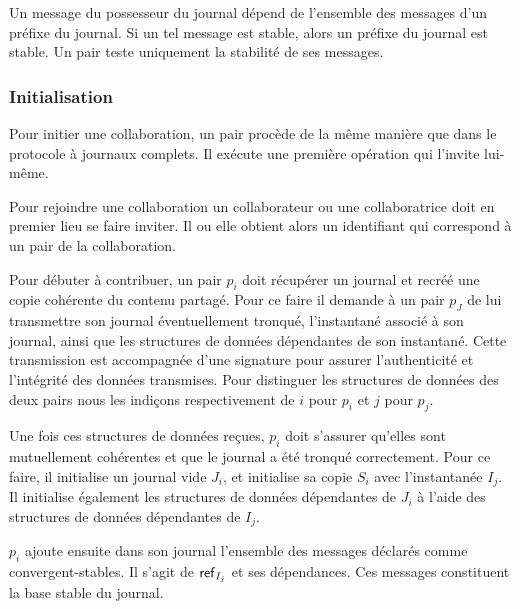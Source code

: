Un message du possesseur du journal dépend de l'ensemble des messages d'un préfixe du journal.
Si un tel message est stable, alors un préfixe du journal est stable.
Un pair teste uniquement la stabilité de ses messages.


\subsubsection{Initialisation}

Pour initier une collaboration, un pair procède de la même manière que dans le protocole à journaux complets.
Il exécute une première opération qui l'invite lui-même.

Pour rejoindre une collaboration un collaborateur ou une collaboratrice doit en premier lieu se faire inviter.
Il ou elle obtient alors un identifiant qui correspond à un pair de la collaboration.

Pour débuter à contribuer, un pair $p_i$ doit récupérer un journal et recréé une copie cohérente du contenu partagé.
Pour ce faire il demande à un pair $p_J$ de lui transmettre son journal éventuellement tronqué, l'instantané associé à son journal, ainsi que les structures de données dépendantes de son instantané.
Cette transmission est accompagnée d'une signature pour assurer l'authenticité et l'intégrité des données transmises.
Pour distinguer les structures de données des deux pairs nous les indiçons respectivement de $i$ pour $p_i$ et $j$ pour $p_j$.

%
%

Une fois ces structures de données reçues, $p_i$ doit s'assurer qu'elles sont mutuellement cohérentes et que le journal a été tronqué correctement.
Pour ce faire, il initialise un journal vide $J_i$, et initialise sa copie $S_i$ avec l'instantanée $I_j$.
Il initialise également les structures de données dépendantes de $J_i$ à l'aide des structures de données dépendantes de $I_j$.

$p_i$ ajoute ensuite dans son journal l'ensemble des messages déclarés comme convergent-stables.
Il s'agit de $\operatorname{\mathsf{ref}}_{I_j}$ et ses dépendances.
Ces messages constituent la base stable du journal.

